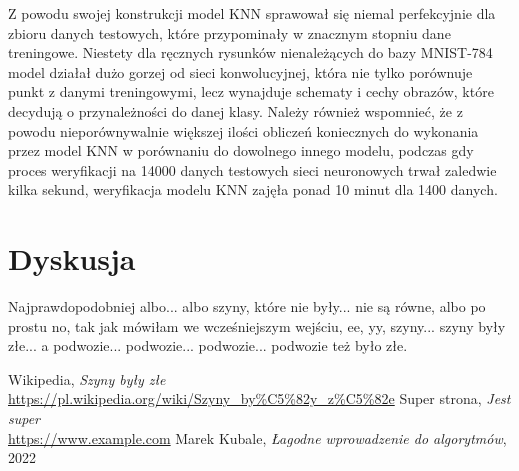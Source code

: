 \documentclass{article}
\begin{document}
Z powodu swojej konstrukcji model KNN sprawował się niemal perfekcyjnie 
dla zbioru danych testowych, które przypominały w znacznym stopniu 
dane treningowe. Niestety dla ręcznych rysunków nienależących do 
bazy MNIST-784 model działał dużo gorzej od sieci konwolucyjnej, 
która nie tylko porównuje punkt z danymi treningowymi, lecz 
wynajduje schematy i cechy obrazów, które decydują o 
przynależności do danej klasy. Należy również wspomnieć, 
że z powodu nieporównywalnie większej ilości obliczeń 
koniecznych do wykonania przez model KNN w porównaniu 
do dowolnego innego modelu, podczas gdy proces weryfikacji 
na 14000 danych testowych sieci neuronowych trwał zaledwie 
kilka sekund, weryfikacja modelu KNN zajęła ponad 10 minut dla 1400 danych.

\section{Dyskusja}

Najprawdopodobniej albo... albo szyny, 
które nie były... nie są równe, 
albo po prostu no, tak jak mówiłam we 
wcześniejszym wejściu, ee, yy, szyny... 
szyny były złe... a podwozie... podwozie... 
podwozie... podwozie też było złe. \cite{szyny}

\renewcommand{\refname}{Źródła}
\begin{thebibliography}{100}
     Wikipedia, 
    \textit{Szyny były złe} 
    \\\url{https://pl.wikipedia.org/wiki/Szyny_by%C5%82y_z%C5%82e}
     Super strona,
    \textit{Jest super}
    \\\url{https://www.example.com}
     Marek Kubale,
    \textit{Łagodne wprowadzenie do algorytmów}, 2022
\end{thebibliography}
\end{document}
